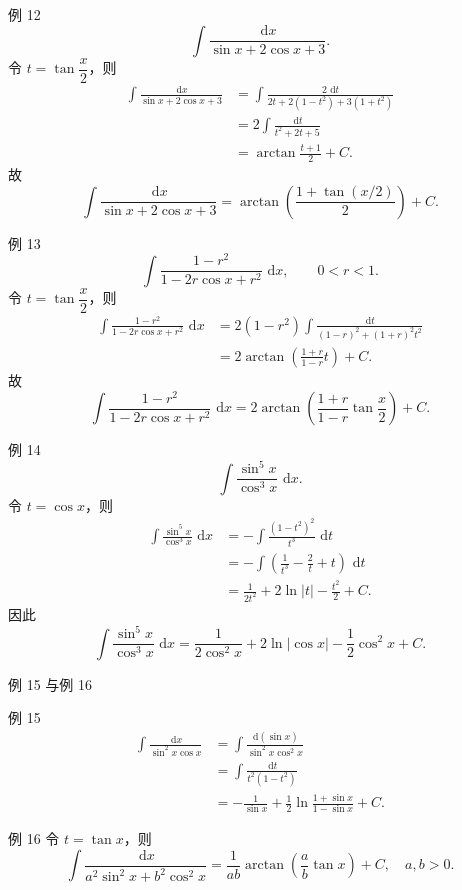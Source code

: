 \documentclass[aspectratio=169,10pt]{ctexbeamer}
\newcommand{\dd}{\,\mathrm{d}}
\begin{document}
\begin{frame}[t]{例 12}
\small
\[
  \int\frac{\dd x}{\sin x+2\cos x+3}.
\]
令 $t=\tan\dfrac{x}{2}$，则
\[
\begin{aligned}
\int\frac{\dd x}{\sin x+2\cos x+3}
&=\int\frac{2\,\dd t}{2t+2(1-t^2)+3(1+t^2)}\\
&=2\int\frac{\dd t}{t^2+2t+5}\\
&=\arctan\frac{t+1}{2}+C.
\end{aligned}
\]
故
\[
  \boxed{\int\frac{\dd x}{\sin x+2\cos x+3}
  =\arctan\left(\frac{1+\tan(x/2)}{2}\right)+C.}
\]
\end{frame}

\begin{frame}[t]{例 13}
\small
\[
  \int\frac{1-r^2}{1-2r\cos x+r^2}\,\dd x,\qquad 0<r<1.
\]
令 $t=\tan\dfrac{x}{2}$，则
\[
\begin{aligned}
\int\frac{1-r^2}{1-2r\cos x+r^2}\,\dd x
&=2(1-r^2)\int
\frac{\dd t}{(1-r)^2+(1+r)^2t^2}\\
&=2\arctan\left(\frac{1+r}{1-r}t\right)+C.
\end{aligned}
\]
故
\[
  \boxed{
  \int\frac{1-r^2}{1-2r\cos x+r^2}\,\dd x
  =2\arctan\left(\frac{1+r}{1-r}\tan\frac{x}{2}\right)+C.}
\]
\end{frame}

\begin{frame}[t]{例 14}
\small
\[
  \int\frac{\sin^5 x}{\cos^3 x}\,\dd x.
\]
令 $t=\cos x$，则
\[
\begin{aligned}
\int\frac{\sin^5 x}{\cos^3 x}\,\dd x
&=-\int\frac{(1-t^2)^2}{t^3}\,\dd t\\
&=-\int\left(\frac1{t^3}-\frac2t+t\right)\,\dd t\\
&=\frac1{2t^2}+2\ln|t|-\frac{t^2}{2}+C.
\end{aligned}
\]
因此
\[
  \boxed{
  \int\frac{\sin^5 x}{\cos^3 x}\,\dd x
  =\frac1{2\cos^2x}+2\ln|\cos x|-\frac12\cos^2x+C.}
\]
\end{frame}

\begin{frame}[t]{例 15 与例 16}
\small
\begin{block}{例 15}
\[
\begin{aligned}
\int\frac{\dd x}{\sin^2x\cos x}
&=\int\frac{\dd(\sin x)}{\sin^2x\cos^2x}\\
&=\int\frac{\dd t}{t^2(1-t^2)}\\
&=-\frac1{\sin x}+\frac12\ln\frac{1+\sin x}{1-\sin x}+C.
\end{aligned}
\]
\end{block}

\begin{block}{例 16}
令 $t=\tan x$，则
\[
\boxed{
\int\frac{\dd x}{a^2\sin^2x+b^2\cos^2x}
=\frac1{ab}\arctan\left(\frac ab\tan x\right)+C,\quad a,b>0.}
\]
\end{block}
\end{frame}
\end{document}
